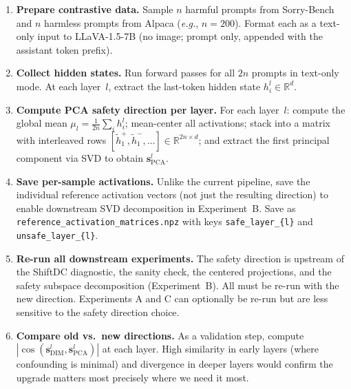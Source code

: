 \documentclass{article}
\newcommand{\eg}{\emph{e.g.}}
\begin{document}
\begin{enumerate}
  \item \textbf{Prepare contrastive data.}  Sample $n$ harmful prompts from
        Sorry-Bench and $n$ harmless prompts from Alpaca (\eg, $n{=}200$).
        Format each as a text-only input to LLaVA-1.5-7B (no image; prompt only,
        appended with the assistant token prefix).

  \item \textbf{Collect hidden states.}  Run forward passes for all $2n$ prompts
        in text-only mode.  At each layer~$l$, extract the last-token hidden
        state $h_i^l \in \mathbb{R}^d$.

  \item \textbf{Compute PCA safety direction per layer.}  For each layer~$l$:
        compute the global mean $\mu_l = \frac{1}{2n}\sum_i h_i^l$; mean-center
        all activations; stack into a matrix with interleaved rows
        $[\tilde{h}_1^+, \tilde{h}_1^-, \ldots] \in \mathbb{R}^{2n \times d}$;
        and extract the first principal component via SVD to obtain
        $\mathbf{s}^l_{\mathrm{PCA}}$.

  \item \textbf{Save per-sample activations.}  Unlike the current pipeline, save
        the individual reference activation vectors (not just the resulting
        direction) to enable downstream SVD decomposition in Experiment~B.  Save
        as \texttt{reference\_activation\_matrices.npz} with keys
        \texttt{safe\_layer\_\{l\}} and \texttt{unsafe\_layer\_\{l\}}.

  \item \textbf{Re-run all downstream experiments.}  The safety direction is
        upstream of the ShiftDC diagnostic, the sanity check, the centered
        projections, and the safety subspace decomposition (Experiment~B).  All
        must be re-run with the new direction.  Experiments A and C can
        optionally be re-run but are less sensitive to the safety direction choice.

  \item \textbf{Compare old vs.\ new directions.}  As a validation step, compute
        $|\cos(\mathbf{s}^l_{\mathrm{DIM}}, \mathbf{s}^l_{\mathrm{PCA}})|$ at
        each layer.  High similarity in early layers (where confounding is
        minimal) and divergence in deeper layers would confirm the upgrade matters
        most precisely where we need it most.
\end{enumerate}
\end{document}
